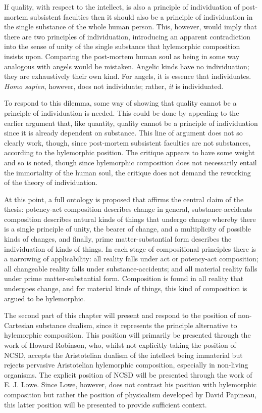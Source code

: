 If quality, with respect to the intellect, is also a principle of individuation of post-mortem subsistent faculties then it should also be a principle of individuation in the single substance of the whole human person. This, however, would imply that there are two principles of individuation, introducing an apparent contradiction into the sense of unity of the single substance that hylemorphic composition insists upon. Comparing the post-mortem human soul as being in some way analogous with angels would be mistaken. Angelic kinds have no individuation; they are exhaustively their own kind. For angels, it is essence that individuates. \emph{Homo sapien}, however, does not individuate; rather, \emph{it} is individuated.

To respond to this dilemma, some way of showing that quality cannot be a principle of individuation is needed. This could be done by appealing to the earlier argument that, like quantity, quality cannot be a principle of individuation since it is already dependent on substance. This line of argument does not so clearly work, though, since post-mortem subsistent faculties are not substances, according to the hylemorphic position. The critique appears to have some weight and so is noted, though since hylemorphic composition does not necessarily entail the immortality of the human soul, the critique does not demand the reworking of the theory of individuation.

At this point, a full ontology is proposed that affirms the central claim of the thesis: potency-act composition describes change in general, substance-accidents composition describes natural kinds of things that undergo change whereby there is a single principle of unity, the bearer of change, and a multiplicity of possible kinds of changes, and finally, prime matter-substantial form describes the individuation of kinds of things. In each stage of compositional principles there is a narrowing of applicability: all reality falls under act or potency-act composition; all changeable reality falls under substance-accidents; and all material reality falls under prime matter-substantial form. Composition is found in all reality that undergoes change, and for material kinds of things, this kind of composition is argued to be hylemorphic.

The second part of this chapter will present and respond to the position of non-Cartesian substance dualism, since it represents the principle alternative to hylemorphic composition. This position will primarily be presented through the work of Howard Robinson, who, whilst not explicitly taking the position of NCSD, accepts the Aristotelian dualism of the intellect being immaterial but rejects pervasive Aristotelian hylemorphic composition, especially in non-living organisms. The explicit position of NCSD will be presented through the work of E. J. Lowe. Since Lowe, however, does not contrast his position with hylemorphic composition but rather the position of physicalism developed by David Papineau, this latter position will be presented to provide sufficient context.


